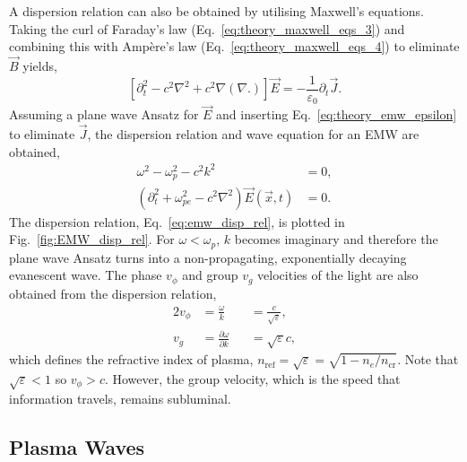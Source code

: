 A dispersion relation can also be obtained by utilising Maxwell's equations.
Taking the curl of Faraday's law (Eq.~\ref{eq:theory_maxwell_eqs_3}) and combining this with Amp\`ere's law (Eq.~\ref{eq:theory_maxwell_eqs_4}) to eliminate $\vec{B}$ yields,
\begin{equation}
    \label{eq:theory_manipulatedmaxwell}
    \left[ \partial_t^2 - c^2\nabla^2 + c^2 \nabla(\nabla.) \right]\vec{E} = -\frac{1}{\varepsilon_0}\partial_t \vec{J}.
\end{equation}
Assuming a plane wave Ansatz for $\vec{E}$ and inserting Eq.~\ref{eq:theory_emw_epsilon} to eliminate $\vec{J}$, the dispersion relation and wave equation for an \ac{EMW} are obtained,
\begin{align}
    \label{eq:emw_disp_rel}
    \omega^2 - \omega_p^2 - c^2 k^2 &= 0,\\
    \label{eq:theory_emw_wave_eq}
    \left( \partial_t^2 + \omega_{pe}^2 - c^2\nabla^2 \right)\vec{E}(\vec{x},t) &= 0.
\end{align}
The dispersion relation, Eq.~\ref{eq:emw_disp_rel}, is plotted in Fig.~\ref{fig:EMW_disp_rel}.
For $\omega<\omega_p$, $k$ becomes imaginary and therefore the plane wave Ansatz turns into a non-propagating, exponentially decaying evanescent wave.
The phase $v_\phi$ and group $v_g$ velocities of the light are also obtained from the dispersion relation,
\begin{alignat}{2}
    v_\phi &= \frac{\omega}{k} &&= \frac{c}{\sqrt{\varepsilon}},\\
    v_g &= \frac{\partial \omega}{\partial k} &&= \sqrt{\varepsilon} c,
\end{alignat}
which defines the refractive index of plasma, $n_{\text{ref}}=\sqrt{\varepsilon} = \sqrt{1-n_e/n_{\text{cr}}}$.
Note that $\sqrt{\varepsilon}<1$ so $v_\phi>c$.
However, the group velocity, which is the speed that information travels, remains subluminal.

\subsection{Plasma Waves}%
\label{sec:theory_longwaves}

